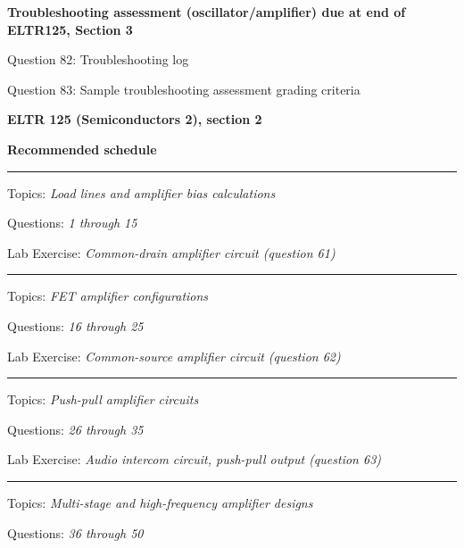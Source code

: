 \hskip 10pt {\bf Troubleshooting assessment (oscillator/amplifier) due at end of ELTR125, Section 3}

\hskip 10pt Question 82: Troubleshooting log
 
\hskip 10pt Question 83: Sample troubleshooting assessment grading criteria
 
\vskip 10pt










\vfil \eject

\centerline{\bf ELTR 125 (Semiconductors 2), section 2} \bigskip 
 
\vskip 10pt

\noindent
{\bf Recommended schedule}

\vskip 5pt

\hrule \vskip 5pt
\noindent
{}

\hskip 10pt Topics: {\it Load lines and amplifier bias calculations}
 
\hskip 10pt Questions: {\it 1 through 15}
 
\hskip 10pt Lab Exercise: {\it Common-drain amplifier circuit (question 61)}
 
\vskip 10pt
\hrule \vskip 5pt
\noindent
{}

\hskip 10pt Topics: {\it FET amplifier configurations}
 
\hskip 10pt Questions: {\it 16 through 25}
 
\hskip 10pt Lab Exercise: {\it Common-source amplifier circuit (question 62)}
 
 
\vskip 10pt
\hrule \vskip 5pt
\noindent
{}

\hskip 10pt Topics: {\it Push-pull amplifier circuits}
 
\hskip 10pt Questions: {\it 26 through 35}
 
\hskip 10pt Lab Exercise: {\it Audio intercom circuit, push-pull output (question 63)}
 

\vskip 10pt
\hrule \vskip 5pt
\noindent
{}

\hskip 10pt Topics: {\it Multi-stage and high-frequency amplifier designs}
 
\hskip 10pt Questions: {\it 36 through 50}
 
